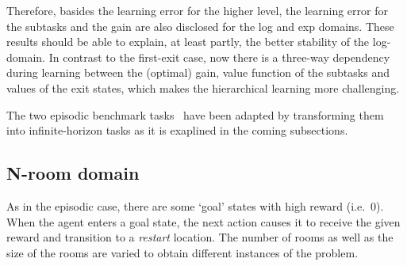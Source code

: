 Therefore, basides the learning error for the higher level, the learning error for the subtasks and the gain are also disclosed for the log and exp domains. These results should be able to explain, at least partly, the better stability of the log-domain. In contrast to the first-exit case, now there is a three-way dependency during learning between the (optimal) gain, value function of the subtasks and values of the exit states, which makes the hierarchical learning more challenging.  

The two episodic benchmark tasks~\citep{Infante2022} have been adapted by transforming them into infinite-horizon tasks as it is exaplined in the coming subsections.

  \subsection{N-room domain}
 As in the episodic case, there are some `goal' states with high reward (i.e.~0). When the agent enters a goal state, the next action causes it to receive the given reward and transition to a {\it restart\/} location. The number of rooms as well as the size of the rooms are varied to obtain different instances of the problem.

